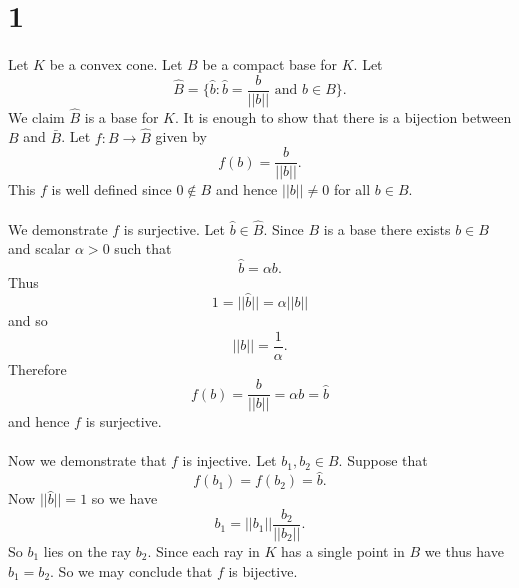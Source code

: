 \documentclass[letterpaper,12pt,oneside,onecolumn]{article}
\begin{document}
\section*{1}
\paragraph{}
Let $K$ be a convex cone. Let $B$ be a compact base for $K$. Let $$\hat{B} = \{\hat{b} : \hat{b} = \frac{b}{||b||} \text{ and } b \in B \}.$$
We claim $\hat{B}$ is a base for $K$. It is enough to show that there is a bijection between $B$ and $\bar{B}$. Let $f: B \rightarrow \hat{B}$ given by
$$f(b) = \frac{b}{||b||}.$$
This $f$ is well defined since $0 \not\in B$ and hence $||b|| \neq 0$ for all $b \in B$.
\paragraph{}
We demonstrate $f$ is surjective. Let $\hat{b} \in \hat{B}$. Since $B$ is a base there exists $b \in B$ and scalar $\alpha > 0$ such that $$\hat{b} = \alpha b.$$
Thus $$1 = ||\hat{b}|| = \alpha ||b||$$
and so $$|| b || = \frac{1}{\alpha}.$$
Therefore $$f(b) = \frac{b}{||b||} = \alpha b = \hat{b}$$
and hence $f$ is surjective.
\paragraph{}
Now we demonstrate that $f$ is injective. Let $b_1, b_2 \in B$. Suppose that
$$f(b_1) = f(b_2) = \hat{b}.$$
Now $||\hat{b}|| = 1$ so we have $$b_1 = ||b_1|| \frac{b_2}{||b_2||}.$$
So $b_1$ lies on the ray $b_2$. Since each ray in $K$ has a single point in $B$ we thus have $b_1 = b_2$. So we may conclude that $f$ is bijective.
\end{document}
